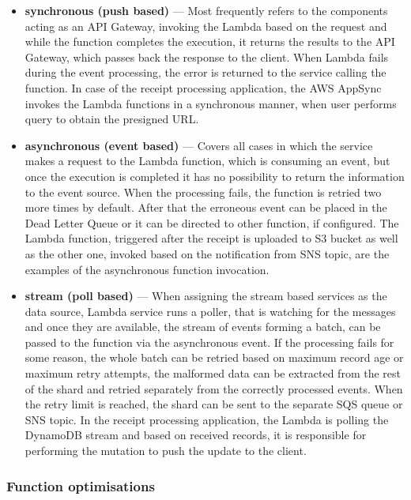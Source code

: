 \begin{itemize}
    \item \textbf{synchronous (push based)} --- Most frequently refers to the components acting as an API Gateway, invoking the Lambda based on the request and while the function completes the execution, it returns the results to the API Gateway, which passes back the response to the client.
    When Lambda fails during the event processing, the error is returned to the service calling the function.
    In case of the receipt processing application, the AWS AppSync invokes the Lambda functions in a synchronous manner, when user performs query to obtain the presigned URL.
    \item \textbf{asynchronous (event based)} --- Covers all cases in which the service makes a request to the Lambda function, which is consuming an event, but once the execution is completed it has no possibility to return the information to the event source. 
    When the processing fails, the function is retried two more times by default.
    After that the erroneous event can be placed in the Dead Letter Queue or it can be directed to other function, if configured.
    The Lambda function, triggered after the receipt is uploaded to S3 bucket as well as the other one, invoked based on the notification from SNS topic, are the examples of the asynchronous function invocation.
    \item \textbf{stream (poll based)} --- When assigning the stream based services as the data source, Lambda service runs a poller, that is watching for the messages and once they are available, the stream of events forming a batch, can be passed to the function via the asynchronous event.
    If the processing fails for some reason, the whole batch can be retried based on maximum record age or maximum retry attempts, the malformed data can be extracted from the rest of the shard and retried separately from the correctly processed events. When the retry limit is reached, the shard can be sent to the separate SQS queue or SNS topic.
    In the receipt processing application, the Lambda is polling the DynamoDB stream and based on received records, it is responsible for performing the mutation to push the update to the client.
\end{itemize}

\subsubsection{Function optimisations}

